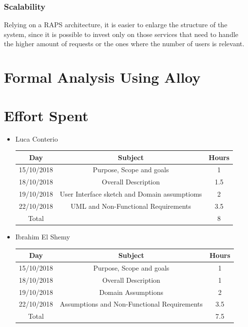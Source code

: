 \documentclass[12pt,a4paper]{article}
\begin{document}
	\subsubsection{Scalability}
	Relying on a RAPS architecture, it is easier to enlarge the structure of the system, since it is possible to invest only on those services that need to handle the higher amount of requests or the ones where the number of users is relevant.
	
	
	\newpage
	\section{Formal Analysis Using Alloy}

	\newpage
	
	\section{Effort Spent}
		\begin{itemize}
			\item Luca Conterio
			\begin{center}
				\begin{tabular}{| c | c | c |}
					\hline
					Day & Subject & Hours \\ \hline
					15/10/2018 & Purpose, Scope and goals & 1 \\
					18/10/2018 & Overall Description & 1.5 \\
                    19/10/2018  & User Interface sketch and Domain assumptioms & 2 \\
                    22/10/2018  & UML and Non-Functional Requirements & 3.5 \\
					\hline
					Total & & 8\\
					\hline
				\end{tabular}
			\end{center}
		
			\item Ibrahim El Shemy
			\begin{center}
				\begin{tabular}{| c | c | c |}
					\hline
					Day & Subject & Hours \\ \hline
					15/10/2018 & Purpose, Scope and goals & 1 \\
					18/10/2018 & Overall Description & 1 \\
         			19/10/2018  & Domain Assumptions & 2 \\
                    22/10/2018  & Assumptions and Non-Functional Requirements & 3.5 \\
					\hline
					Total & & 7.5\\
					\hline
				\end{tabular}
			\end{center}
		\end{itemize}
\end{document}
